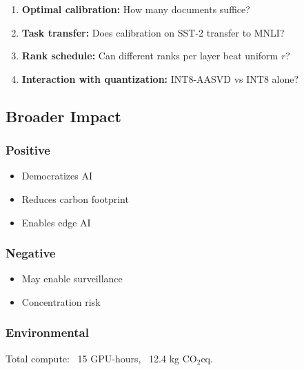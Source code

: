 \begin{enumerate}
\item \textbf{Optimal calibration:} How many documents suffice?
\item \textbf{Task transfer:} Does calibration on SST-2 transfer to MNLI?
\item \textbf{Rank schedule:} Can different ranks per layer beat uniform $r$?
\item \textbf{Interaction with quantization:} INT8-AASVD vs INT8 alone?

\end{enumerate}
\subsection{Broader Impact}

\subsubsection{Positive}
\begin{itemize}
\item Democratizes AI
\item Reduces carbon footprint
\item Enables edge AI

\end{itemize}
\subsubsection{Negative}
\begin{itemize}
\item May enable surveillance
\item Concentration risk

\end{itemize}
\subsubsection{Environmental}
Total compute: ~15 GPU-hours, ~12.4 kg CO$_2$eq.